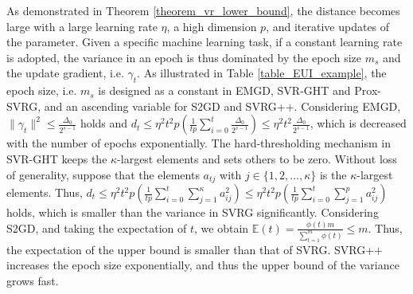 \documentclass[letterpaper]{article}
\begin{document}
As demonstrated in Theorem \ref{theorem_vr_lower_bound}, the distance becomes large with a large learning rate $\eta$, a high dimension $p$, and iterative updates of the parameter. Given a specific machine learning task, if a constant learning rate is adopted, the variance in an epoch is thus dominated by  the epoch size $m_s$ and the update gradient, i.e.  $\gamma_t$.  As illustrated in Table \ref{table_EUI_example}, the epoch size, i.e. $m_s$ is designed as a constant in EMGD, SVR-GHT and Prox-SVRG, and  an ascending variable for  S2GD and SVRG++. Considering EMGD,  $\parallel \gamma_t \parallel^2 \le \frac{\Delta_0}{2^{s-1}}$ holds and $d_t\le \eta^2 t^2 p \left( \frac{1}{tp}\sum\limits_{i=0}^t   \frac{\Delta_0}{2^{s-1}} \right)\le \eta^2t^2 \frac{\Delta_0}{2^{s-1}}$, which is decreased with the number of epochs exponentially. The hard-thresholding mechanism in SVR-GHT keeps the $\kappa$-largest elements and sets others to be zero. Without loss of generality, suppose that the elements $a_{tj}$ with $j\in\{1,2, ..., \kappa\}$ is the $\kappa$-largest elements. Thus, $d_t \le \eta^2 t^2p  \left( \frac{1}{tp}\sum\limits_{i=0}^t   \sum\limits_{j=1}^{\kappa}   a_{ij}^2 \right) \le \eta^2 t^2p  \left( \frac{1}{tp}\sum\limits_{i=0}^t   \sum\limits_{j=1}^p   a_{ij}^2 \right)$ holds, which is smaller than the variance in SVRG significantly. Considering S2GD, and taking the expectation of $t$, we obtain $\mathbb{E}(t)=\frac{\phi(t)m}{\sum_{t=1}^m \phi(t)} \le m$. Thus, the expectation of the upper bound is smaller than that of SVRG. SVRG++ increases the epoch size exponentially, and thus the upper bound of  the variance grows fast.  
\end{document}
